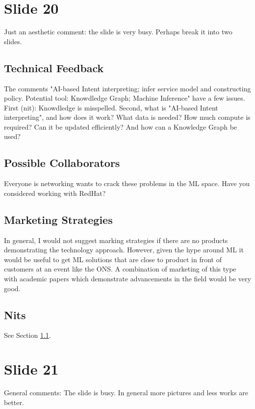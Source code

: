 \documentclass[11pt, oneside]{article}   	%
\begin{document}
\section{Slide 20}
\label{sec:slide20}

Just an aesthetic comment: the slide is very busy. Perhaps break it into two slides.

\subsection{Technical Feedback}
\label{slide20:technical_feedback}
The comments "AI-based Intent interpreting; infer service model and constructing policy. Potential tool: Knowdledge Graph; Machine Inference" have a few issues.
First (nit): Knowdledge is misspelled. Second, what is "AI-based Intent interpreting", and how does it work? What data is needed? How much compute is required?
Can it be updated efficiently? And how can a Knowledge Graph be used?

\subsection{Possible Collaborators}
\label{slide20:possible_collaborators}
Everyone is networking wants to crack these problems in the ML space. Have you considered working with RedHat?

\subsection{Marketing Strategies}
\label{slide20:marketing_strategies}
In general, I would not suggest marking strategies if there are no products demonstrating the technology approach. However, given
the hype around ML it would be useful to get ML solutions that are close to product in front of customers at an event like the ONS. A combination of
marketing of this type with academic papers which demonstrate advancements in the field would be very good.

\subsection{Nits}
\label{slide20:nits}
See Section \ref{slide20:technical_feedback}.


\section{Slide 21}
\label{sec:slide21}

General comments: The slide is busy. In general more pictures and less works are better. 
\end{document}
